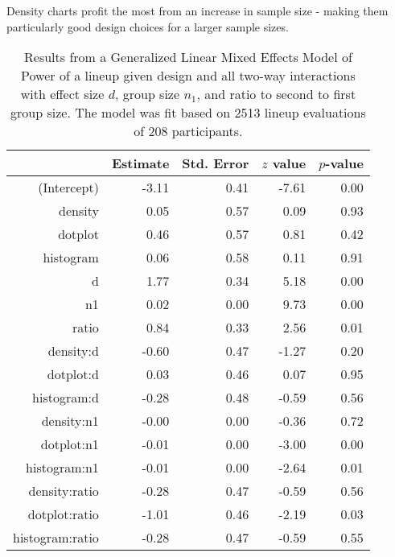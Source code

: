 Density charts profit the most from an increase in sample size - making them particularly good design choices for a larger sample sizes.
\begin{table}[ht]
\begin{center}
\begin{tabular}{rrrrr}
  \hline
 & Estimate & Std. Error & $z$ value & $p$-value \\ 
  \hline
(Intercept) & -3.11 & 0.41 & -7.61 & 0.00 \\ 
  density & 0.05 & 0.57 & 0.09 & 0.93 \\ 
  dotplot & 0.46 & 0.57 & 0.81 & 0.42 \\ 
  histogram & 0.06 & 0.58 & 0.11 & 0.91 \\ 
  d & 1.77 & 0.34 & 5.18 & 0.00 \\ 
  n1 & 0.02 & 0.00 & 9.73 & 0.00 \\ 
  ratio & 0.84 & 0.33 & 2.56 & 0.01 \\ 
  density:d & -0.60 & 0.47 & -1.27 & 0.20 \\ 
  dotplot:d & 0.03 & 0.46 & 0.07 & 0.95 \\ 
  histogram:d & -0.28 & 0.48 & -0.59 & 0.56 \\ 
  density:n1 & -0.00 & 0.00 & -0.36 & 0.72 \\ 
  dotplot:n1 & -0.01 & 0.00 & -3.00 & 0.00 \\ 
  histogram:n1 & -0.01 & 0.00 & -2.64 & 0.01 \\ 
  density:ratio & -0.28 & 0.47 & -0.59 & 0.56 \\ 
  dotplot:ratio & -1.01 & 0.46 & -2.19 & 0.03 \\ 
  histogram:ratio & -0.28 & 0.47 & -0.59 & 0.55 \\ 
   \hline
\end{tabular}
\end{center}
\caption{Results from a Generalized Linear Mixed Effects Model of Power of a lineup given design and all two-way interactions with effect size $d$, group size $n_1$, and ratio to second to first group size. The model was fit based on 2513 lineup evaluations of 208 participants.}
\label{tbl:power2}
\end{table}

